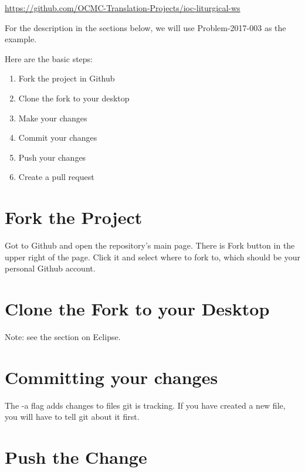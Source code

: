 \documentclass[]{memoir}
\begin{document}
\url{https://github.com/OCMC-Translation-Projects/ioc-liturgical-ws}

For the description in the sections below, we will use Problem-2017-003 as the example.

Here are the basic steps:

\begin{enumerate}
    \item{Fork the project in Github}
    \item{Clone the fork to your desktop}
    \item{Make your changes}
    \item{Commit your changes}
    \item{Push your changes}
    \item{Create a pull request}
\end{enumerate}

\section{Fork the Project}

Got to Github and open the repository's main page.  There is  Fork button in the upper right of the page.  Click it and select where to fork to, which should be your personal Github account.

\section{Clone the Fork to your Desktop}

\begin{bash}
\end{bash}

Note: see the section on Eclipse.

\section{Committing your changes}

\begin{bash}
\end{bash}

The -a flag adds changes to files git is tracking.  If you have created a new file, you will have to tell git about it first.

\section{Push the Change}
\end{document}
